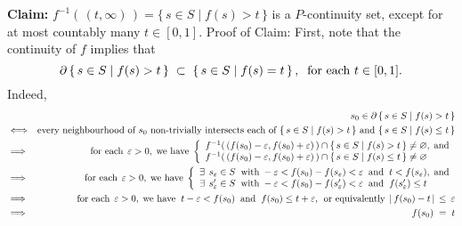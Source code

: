 	\begin{center}
	\vskip 0.3cm
	\begin{minipage}{6.5in}
	\noindent
	\textbf{Claim:}
	\vskip 0.1cm
	\noindent
	$f^{-1}\!\left(\,(t,\infty)\,\right) = \{\,s\in S \;\vert\; f(s) > t\,\}$ is a $P$-continuity set,
	except for at most countably many $t \in [0,1]$.
	\vskip 0.2cm
	\noindent
	Proof of Claim:\;\;
	First, note that the continuity of $f$ implies that
	\begin{equation*}
	\partial\left\{\,s \in S \;\vert\; f(s) > t\,\right\} \;\subset\; \left\{\,s \in S \;\vert\; f(s) = t\,\right\},
	\;\;\textnormal{for each $t \in [0,1]$}.
	\end{equation*}
	Indeed,
	\begin{eqnarray*}
	&&
		s_{0} \in \partial\left\{\,s \in S \;\vert\; f(s) > t\,\right\}
	\\	
	&\Longleftrightarrow&
		\textnormal{every neighbourhood of $s_{0}$ non-trivially intersects each of
		$\left\{\,s \in S \;\vert\; f(s) > t\,\right\}$ and $\left\{\,s \in S \;\vert\; f(s) \leq t\,\right\}$}
	\\
	&\Longrightarrow&
		\textnormal{for each}\;\,\varepsilon > 0,\;\textnormal{we have}\;
		\left\{\begin{array}{l}
			f^{-1}\!\left(\,(f(s_{0})-\varepsilon,f(s_{0})+\varepsilon)\,\right) \cap \{\,s\in S\;\vert\;f(s) > t \,\} \neq \varnothing,\;\textnormal{and}
			\\
			f^{-1}\!\left(\,(f(s_{0})-\varepsilon,f(s_{0})+\varepsilon)\,\right) \cap \{\,s\in S\;\vert\;f(s) \leq t \,\} \neq \varnothing
		\end{array}\right.
	\\
	&\Longrightarrow&
		\textnormal{for each}\;\,\varepsilon > 0,\;\textnormal{we have}\;
		\left\{\begin{array}{l}
			\exists\;\,s_{\varepsilon} \in S
			\;\;\textnormal{with}\; -\varepsilon < f(s_{0})-f(s_{\varepsilon}) < \varepsilon
			\;\;\textnormal{and}\;\; t < f(s_{\varepsilon}),\;\textnormal{and}
			\\
			\exists\;\,s'_{\varepsilon} \in S
			\;\;\textnormal{with}\; -\varepsilon < f(s_{0})-f(s'_{\varepsilon}) < \varepsilon
			\;\;\textnormal{and}\;\;f(s'_{\varepsilon}) \leq t
		\end{array}\right.
	\\
	&\Longrightarrow&
		\textnormal{for each}\;\,\varepsilon > 0,\;\textnormal{we have}\;\;
		t -\varepsilon < f(s_{0})\;\;\textnormal{and}\;\;f(s_{0}) \leq t + \varepsilon,
		\;\,\textnormal{or equivalently}\;\,\vert\, f(s_{0}) - t \,\vert \,\leq\, \varepsilon
	\\
	&\Longrightarrow&
		f(s_{0}) \;=\; t
	\end{eqnarray*}
	\end{minipage}
	\end{center}
